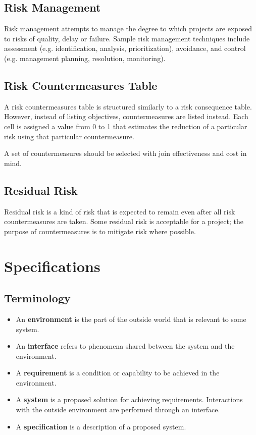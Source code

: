 \documentclass[12pt,titlepage]{article}
\let\stdsection\section
\renewcommand\section{\clearpage\stdsection}
\begin{document}
    \subsection{Risk Management}
      Risk management attempts to manage the degree to which projects are exposed to risks of quality, delay or failure. Sample risk management
      techniques include assessment (e.g. identification, analysis, prioritization), avoidance, and control (e.g. management planning, resolution,
      monitoring).

    \subsection{Risk Countermeasures Table}
      A risk countermeasures table is structured similarly to a risk consequence table. However, instead of listing objectives, countermeasures are
      listed instead. Each cell is assigned a value from 0 to 1 that estimates the reduction of a particular risk using that particular countermeasure.

      A set of countermeasures should be selected with join effectiveness and cost in mind.

    \subsection{Residual Risk}
      Residual risk is a kind of risk that is expected to remain even after all risk countermeasures are taken. Some residual risk is acceptable for a
      project; the purpose of countermeasures is to mitigate risk where possible.

  \section{Specifications}

    \subsection{Terminology}
      \begin{itemize}
        \item An \textbf{environment} is the part of the outside world that is relevant to some system.
        \item An \textbf{interface} refers to phenomena shared between the system and the environment.
        \item A \textbf{requirement} is a condition or capability to be achieved in the environment.
        \item A \textbf{system} is a proposed solution for achieving requirements. Interactions with the outside environment are performed
          through an interface.
        \item A \textbf{specification} is a description of a proposed system.
      \end{itemize}
\end{document}
